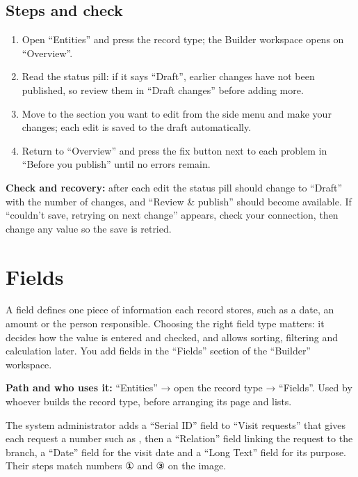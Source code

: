 \subsection{Steps and check}
\begin{enumerate}
\item Open “Entities” and press the record type; the Builder workspace opens on “Overview”.
\item Read the status pill: if it says “Draft”, earlier changes have not been published, so review them in “Draft changes” before adding more.
\item Move to the section you want to edit from the side menu and make your changes; each edit is saved to the draft automatically.
\item Return to “Overview” and press the fix button next to each problem in “Before you publish” until no errors remain.
\end{enumerate}

\textbf{Check and recovery:} after each edit the status pill should change to “Draft” with the number of changes, and “Review \& publish” should become available. If “couldn't save, retrying on next change” appears, check your connection, then change any value so the save is retried.

\clearpage
\section{Fields}
\label{sec:builder-feature-fields}

A field defines one piece of information each record stores, such as a date, an amount or the person responsible. Choosing the right field type matters: it decides how the value is entered and checked, and allows sorting, filtering and calculation later. You add fields in the “Fields” section of the “Builder” workspace.

\textbf{Path and who uses it:} “Entities” → open the record type → “Fields”. Used by whoever builds the record type, before arranging its page and lists.

\begin{rcnote}
The system administrator adds a “Serial ID” field to “Visit requests” that gives each request a number such as , then a “Relation” field linking the request to the branch, a “Date” field for the visit date and a “Long Text” field for its purpose. Their steps match numbers ① and ③ on the image.
\end{rcnote}

